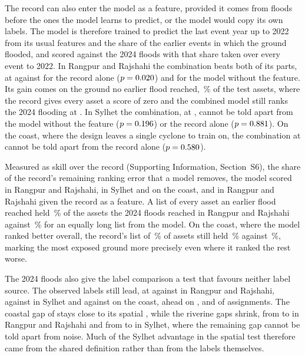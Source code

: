 \documentclass[10pt,a4paper,twocolumn]{article}
\begin{document}
The record can also enter the model as a feature, provided it comes from floods before the ones the model learns to predict, or the model would copy its own labels. The model is therefore trained to predict the last event year up to 2022 from its usual features and the share of the earlier events in which the ground flooded, and scored against the 2024 floods with that share taken over every event to 2022. In Rangpur and Rajshahi the combination beats both of its parts, at \RRPastFeatAUC{} against \RRPastFeatOnlyAUC{} for the record alone ($p=0.020{}$) and \RRPastFeatWithoutAUC{} for the model without the feature. Its gain comes on the ground no earlier flood reached, \RRPastFeatUnseenShare{}\,\% of the test assets, where the record gives every asset a score of zero and the combined model still ranks the 2024 flooding at \RRPastFeatUnseenAUC{}. In Sylhet the combination, at \SylhetPastFeatAUC{}, cannot be told apart from the model without the feature ($p=0.196{}$) or the record alone ($p=0.881{}$). On the coast, where the design leaves a single cyclone to train on, the combination at \CoastalPastFeatAUC{} cannot be told apart from the record alone ($p=0.580{}$).

Measured as skill over the record (Supporting Information, Section~S6), the share of the record's remaining ranking error that a model removes, the model scored \RRSkillModel{} in Rangpur and Rajshahi, \SylhetSkillModel{} in Sylhet and \CoastalSkillModel{} on the coast, and \RRSkillPastFeat{} in Rangpur and Rajshahi given the record as a feature. A list of every asset an earlier flood reached held \RRPlanAllRecord{}\,\% of the assets the 2024 floods reached in Rangpur and Rajshahi against \RRPlanAllModel{}\,\% for an equally long list from the model. On the coast, where the model ranked better overall, the record's list of \CoastalPlanListShare{}\,\% of assets still held \CoastalPlanAllRecord{}\,\% against \CoastalPlanAllModel{}\,\%, marking the most exposed ground more precisely even where it ranked the rest worse.

The 2024 floods also give the label comparison a test that favours neither label source. The observed labels still lead, at \RRTempAUC{} against \RRTempProxyAUC{} in Rangpur and Rajshahi, \SylhetTempAUC{} against \SylhetTempProxyAUC{} in Sylhet and \CoastalTempAUC{} against \CoastalTempProxyAUC{} on the coast, ahead on \RRTempProxyAhead{}, \SylhetTempProxyAhead{} and \CoastalTempProxyAhead{} of \RRTempSeeds{} assignments. The coastal gap of \CoastalTempProxyGap{} stays close to its spatial \CoastalLabelGap{}, while the riverine gaps shrink, from \RRLabelGap{} to \RRTempProxyGap{} in Rangpur and Rajshahi and from \SylhetLabelGap{} to \SylhetTempProxyGap{} in Sylhet, where the remaining gap cannot be told apart from noise. Much of the Sylhet advantage in the spatial test therefore came from the shared definition rather than from the labels themselves.
\end{document}
